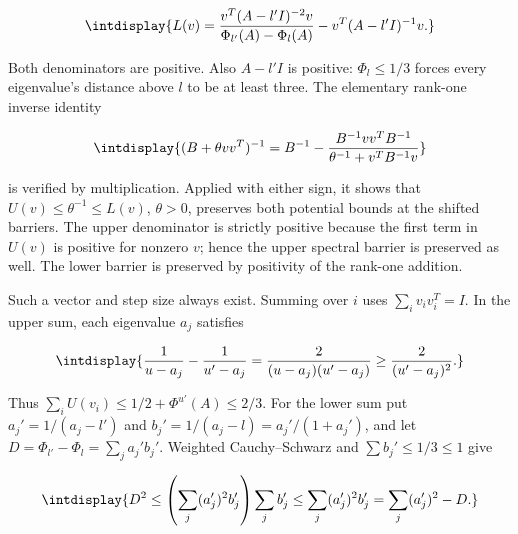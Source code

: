 \begingroup\renewcommand{\theHequation}{intdisplay.567}
\begin{equation*}
\intdisplay{
L(v)=\frac{v^T(A-l'I)^{-2}v}{\Phi_{l'}(A)-\Phi_l(A)}
                         -v^T(A-l'I)^{-1}v.
}
\end{equation*}
\endgroup


Both denominators are positive. Also \(A-l'I\) is positive: \(\Phi_l\le1/3\) forces every eigenvalue's distance above \(l\) to be at least three. The elementary rank-one inverse identity


\begingroup\renewcommand{\theHequation}{intdisplay.568}
\begin{equation*}
\intdisplay{
(B+\theta vv^T)^{-1}
 =B^{-1}-\frac{B^{-1}vv^TB^{-1}}{\theta^{-1}+v^TB^{-1}v}
}
\end{equation*}
\endgroup


is verified by multiplication. Applied with either sign, it shows that \(U(v)\le\theta^{-1}\le L(v)\), \(\theta>0\), preserves both potential bounds at the shifted barriers. The upper denominator is strictly positive because the first term in \(U(v)\) is positive for nonzero \(v\); hence the upper spectral barrier is preserved as well. The lower barrier is preserved by positivity of the rank-one addition.



Such a vector and step size always exist. Summing over \(i\) uses \(\sum_i v_iv_i^T=I\). In the upper sum, each eigenvalue \(a_j\) satisfies


\begingroup\renewcommand{\theHequation}{intdisplay.569}
\begin{equation*}
\intdisplay{
\frac1{u-a_j}-\frac1{u'-a_j}
       =\frac2{(u-a_j)(u'-a_j)}\ge\frac2{(u'-a_j)^2}.
}
\end{equation*}
\endgroup


Thus \(\sum_iU(v_i)\le1/2+\Phi^{u'}(A)\le2/3\). For the lower sum put \(a_j'=1/(a_j-l')\) and \(b_j'=1/(a_j-l)=a_j'/(1+a_j')\), and let \(D=\Phi_{l'}-\Phi_l=\sum_j a_j'b_j'\). Weighted Cauchy--Schwarz and \(\sum b_j'\le1/3\le1\) give


\begingroup\renewcommand{\theHequation}{intdisplay.570}
\begin{equation*}
\intdisplay{
D^2\le\left(\sum_j(a_j')^2b_j'\right)\sum_jb_j'
 \le\sum_j(a_j')^2b_j'
 =\sum_j(a_j')^2-D.
}
\end{equation*}
\endgroup

